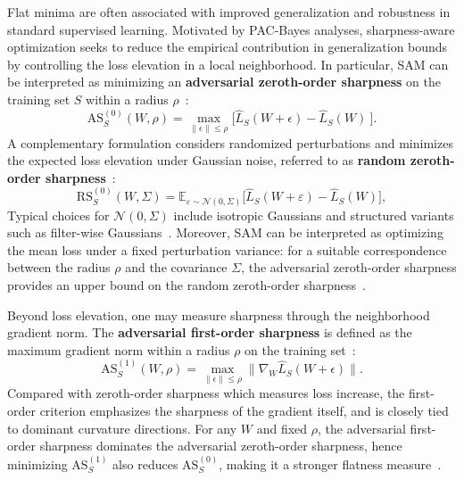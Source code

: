 \documentclass{article}
\theoremstyle{plain}
\theoremstyle{definition}
\theoremstyle{remark}
\begin{document}
Flat minima are often associated with improved generalization and robustness in standard supervised learning. Motivated by PAC-Bayes analyses, sharpness-aware optimization seeks to reduce the empirical contribution in generalization bounds by controlling the loss elevation in a local neighborhood. In particular, SAM can be interpreted as minimizing an \textbf{adversarial zeroth-order sharpness} on the training set $S$ within a radius $\rho$~\citep{AWP2020,foretSharpnessAwareMinimizationEfficiently2021}:
{%
\setlength{\abovedisplayskip}{2pt}
\setlength{\belowdisplayskip}{3pt}
\setlength{\abovedisplayshortskip}{3pt}
\setlength{\belowdisplayshortskip}{3pt}
\[\mathrm{AS}^{(0)}_S(W,\rho) =\max_{ \| \epsilon \|\leq \rho } \Big[ \hat{L}_{S}(W+{\epsilon})-\hat{L}_{S}(W)\ \Big].\]
}
A complementary formulation considers randomized perturbations and minimizes the expected loss elevation under Gaussian noise, referred to as \textbf{random zeroth-order sharpness}~\citep{liRevisitingRandomWeight2024,jiang2019fantasticgeneralizationmeasures}:
{%
\setlength{\abovedisplayskip}{2pt}
\setlength{\belowdisplayskip}{3pt}
\setlength{\abovedisplayshortskip}{3pt}
\setlength{\belowdisplayshortskip}{3pt}
\[
\mathrm{RS}_S^{(0)}({W}, \Sigma)
 =
 \mathbb{E}_{\varepsilon \sim \mathcal{N}(0,\Sigma)}
 \big[
 \hat{L}_{S}({W}+\varepsilon) - \hat{L}_{S}({W})
 \big],
 \]}Typical choices for $\mathcal{N}(0,\Sigma)$ include isotropic Gaussians and structured variants such as filter-wise Gaussians~\citep{pmlr-v151-bisla22a}. Moreover, SAM can be interpreted as optimizing the mean loss under a fixed perturbation variance: for a suitable correspondence between the radius $\rho$ and the covariance $\Sigma$, the adversarial zeroth-order sharpness provides an upper bound on the random zeroth-order sharpness~\cite{mollenhoffSAMOptimalRelaxation2022}.

Beyond loss elevation, one may measure sharpness through the neighborhood gradient norm. The \textbf{adversarial first-order sharpness} is defined as the maximum gradient norm within a radius $\rho$ on the training set~\citep{Zhang_GAM}:
{%
\setlength{\abovedisplayskip}{2pt}
\setlength{\belowdisplayskip}{3pt}
\setlength{\abovedisplayshortskip}{3pt}
\setlength{\belowdisplayshortskip}{3pt}
\[\mathrm{AS}^{(1)}_S(W,\rho) = \max_{ \| \epsilon \|\leq \rho } \| \nabla_{W} \hat{L}_S(W+\epsilon)\|.\]}Compared with zeroth-order sharpness which measures  loss increase, the first-order criterion emphasizes the sharpness of the gradient itself, and is closely tied to dominant curvature directions. For any $W$ and fixed $\rho$, the adversarial first-order sharpness dominates the adversarial zeroth-order sharpness, hence minimizing $\mathrm{AS}^{(1)}_S$ also reduces $\mathrm{AS}^{(0)}_S$, making it a stronger flatness measure~\citep{Zhang_GAM}.
\end{document}
